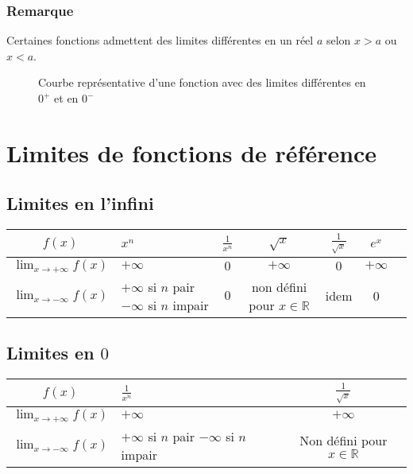 \documentclass[9pt,twoside]{article}
\begin{document}
\subsubsection*{Remarque}

Certaines fonctions admettent des limites différentes en un réel $a$ selon $x>a$ ou $x<a$.
\begin{figure}[H]
	\centering
	\caption{Courbe représentative d'une fonction avec des limites différentes en $0^+$ et en $0^-$}
\end{figure}

\section{Limites de fonctions de référence}

\subsection{Limites en l'infini}

\begin{center}
	\begin{tabular}{|c|p{25mm}|c|c|c|c|c|}
		\hline
		$f(x)$ & $x^n$& $\frac{1}{x^n}$ & $\sqrt{x}$ & $\frac{1}{\sqrt{x}}$ & $e^x$ \\ \hline
		$\lim_{x\to+\infty}f(x)$ & $+\infty$ & $0$ & $+\infty$ & $0$ & $+\infty$ \\ \hline
		$\lim_{x\to-\infty}f(x)$ & $+\infty$ si $n$ pair \newline$-\infty$ si $n$ impair  & $0$ &non défini pour $x\in\mathbb{R}$ & idem & 0 \\ \hline
	\end{tabular}
\end{center}

\subsection{Limites en $0$}
\begin{center}
	\begin{tabular}{|c|p{25mm}|c|}
		\hline
		$f(x)$ & \hfil$\frac{1}{x^n}$ & \hfil $\frac{1}{\sqrt{x}}$ \\ \hline	
		$\lim_{x\to+\infty}f(x)$ & \hfil$+\infty$ & \hfil$+\infty$ \\ \hline
		$\lim_{x\to-\infty}f(x)$ & $+\infty$ si $n$ pair \newline $-\infty$ si $n$ impair & Non défini pour $x\in \mathbb{R}$ \\ \hline
	\end{tabular}
\end{center}
\end{document}

